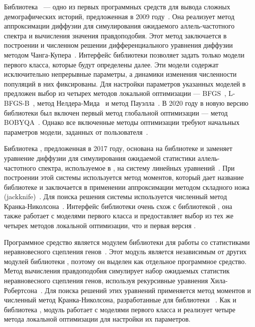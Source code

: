 Библиотека \dadi~--- одно из первых программных средств для вывода сложных демографических историй, предложенная в 2009 году~\cite{gutenkunst2009inferring}. 
Она реализует метод аппроксимации диффузии для симулирования ожидаемого аллель-частотного спектра и вычисления значения правдоподобия.
Этот метод заключается в построении и численном решении дифференциального уравнения диффузии методом Чанга-Купера~\cite{chang1970practical}.
Интерфейс библиотеки \dadi позволяет задать только модели первого класса, которые будут определены далее.
Эти модели содержат исключительно непрерывные параметры, а динамики изменения численности популяций в них фиксированы.
Для настройки параметров указанных моделей в \dadi предложен выбор из четырех методов локальной оптимизации --- BFGS~\cite{broyden1970convergence, fletcher1970new,goldfarb1970family,shanno1970conditioning}, L-BFGS-B~\cite{byrd1995limited}, метод Нелдера-Мида~\cite{nelder1965simplex} и метод Пауэлла~\cite{powell1964efficient}.
В 2020 году в новую версию библиотеки был включен первый метод глобальной оптимизации --- метод BOBYQA~\cite{powell2009bobyqa}.
Однако все включенные методы оптимизации \dadi требуют начальных параметров модели, заданных от пользователя~\cite{gutenkunst2009inferring}.

Библиотека \moments, предложенная в 2017 году, основана на библиотеке \dadi и заменяет уравнение диффузии для симулирования ожидаемой статистики аллель-частотного спектра, используемое в \dadi, на систему линейных уравнений~\cite{jouganous2017inferring}.
При построении этой системы используется метод моментов, который дает название библиотеке и заключается в применении аппроксимации методом складного ножа (jackknife)~\cite{gravel2014predicting}.
Для поиска решения системы используется численный метод Кранка-Николсона~\cite{baolin1994alternating}.
Интерфейс библиотеки \moments очень схож с библиотекой \dadi, она также работает с моделями первого класса и предоставляет выбор из тех же четырех методов локальной оптимизации, что и первая версия \dadi.

Программное средство \momentsLD является модулем библиотеки \moments для работы со статистиками неравновесного сцепления генов~\cite{ragsdale2019models}.
Этот модуль является независимым от других модулей библиотеки \moments, поэтому он выделен как отдельное программное средство.
Метод вычисления правдоподобия симулирует набор ожидаемых статистик неравновесного сцепления генов, используя рекурсивные уравнения Хила-Робертсона~\cite{hill1968linkage}.
Для поиска решений этих уравнений применяется метод моментов и численный метод Кранка-Николсона, разработанные для библиотеки \moments~\cite{jouganous2017inferring, ragsdale2019models}.
Как и библиотека \moments, модуль \momentsLD работает с моделями первого класса и реализует четыре метода локальной оптимизации для настройки их параметров.


